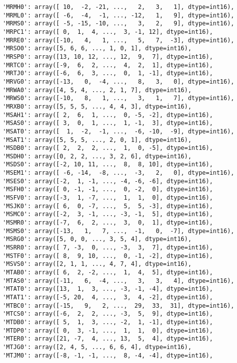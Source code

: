 \documentclass[11pt]{article}
\begin{document}
\begin{verbatim}
 'MRMH0': array([ 10,  -2, -21, ...,   2,   3,   1], dtype=int16),
 'MRML0': array([ -6,  -4,  -1, ..., -12,   1,   9], dtype=int16),
 'MRMS0': array([ -5, -15, -10, ...,   3,   2,   9], dtype=int16),
 'MRPC1': array([ 0,  1,  4, ...,  3, -1, 12], dtype=int16),
 'MRRE0': array([-10,   4,   1, ...,   5,   7,  -3], dtype=int16),
 'MRSO0': array([5, 6, 6, ..., 1, 0, 1], dtype=int16),
 'MRSP0': array([13, 10, 12, ..., 12,  9,  7], dtype=int16),
 'MRTC0': array([-9,  6,  2, ...,  4,  2,  1], dtype=int16),
 'MRTJ0': array([-6,  6,  3, ...,  0,  1, -1], dtype=int16),
 'MRVG0': array([-13,   0,  -4, ...,   8,   3,   0], dtype=int16),
 'MRWA0': array([4, 5, 4, ..., 2, 1, 7], dtype=int16),
 'MRWS0': array([-10,   8,   1, ...,   3,   1,   7], dtype=int16),
 'MRXB0': array([5, 5, 5, ..., 4, 4, 3], dtype=int16),
 'MSAH1': array([ 2,  6,  1, ...,  0, -5, -2], dtype=int16),
 'MSAS0': array([ 3,  0,  1, ...,  1, -1,  3], dtype=int16),
 'MSAT0': array([  1,  -2,  -1, ...,  -6, -10,  -9], dtype=int16),
 'MSAT1': array([5, 5, 5, ..., 2, 0, 1], dtype=int16),
 'MSDB0': array([ 2,  2,  2, ...,  1,  0, -5], dtype=int16),
 'MSDH0': array([0, 2, 2, ..., 3, 2, 6], dtype=int16),
 'MSDS0': array([-2, 10, 11, ...,  8,  8, 10], dtype=int16),
 'MSEM1': array([ -6, -14,  -8, ...,  -3,   2,   0], dtype=int16),
 'MSES0': array([-2,  1, -1, ..., -4, -6, -6], dtype=int16),
 'MSFH0': array([ 0, -1, -1, ...,  0, -2,  0], dtype=int16),
 'MSFV0': array([-3,  1, -7, ...,  1,  1,  0], dtype=int16),
 'MSJK0': array([ 6,  0, -7, ...,  5,  5, -3], dtype=int16),
 'MSMC0': array([-2,  3, -1, ..., -3, -1,  5], dtype=int16),
 'MSMR0': array([-7,  6,  2, ...,  3,  0,  1], dtype=int16),
 'MSMS0': array([-13,   1,   7, ...,  -1,   0,  -7], dtype=int16),
 'MSRG0': array([5, 0, 0, ..., 3, 5, 4], dtype=int16),
 'MSRR0': array([ 7, -3,  0, ..., -3,  3,  7], dtype=int16),
 'MSTF0': array([ 8,  9, 10, ...,  0, -1, -2], dtype=int16),
 'MSVS0': array([2, 1, 1, ..., 4, 7, 4], dtype=int16),
 'MTAB0': array([ 6,  2, -2, ...,  1,  4,  5], dtype=int16),
 'MTAS0': array([-11,   6,  -4, ...,   3,   3,   4], dtype=int16),
 'MTAT0': array([13,  1,  3, ..., -3, -1, -4], dtype=int16),
 'MTAT1': array([-5, 20,  4, ...,  3,  4, -2], dtype=int16),
 'MTBC0': array([-15,   9,   2, ...,  29,  33,  31], dtype=int16),
 'MTCS0': array([-6,  2,  2, ..., -3,  5,  9], dtype=int16),
 'MTDB0': array([ 5,  1,  3, ..., -2,  1, -1], dtype=int16),
 'MTDP0': array([ 0,  3, -1, ...,  1,  1,  0], dtype=int16),
 'MTER0': array([21, -7,  4, ..., 13,  5,  4], dtype=int16),
 'MTJG0': array([2, 4, 5, ..., 6, 6, 4], dtype=int16),
 'MTJM0': array([-8, -1, -1, ...,  8, -4, -4], dtype=int16),

\end{verbatim}
\end{document}
